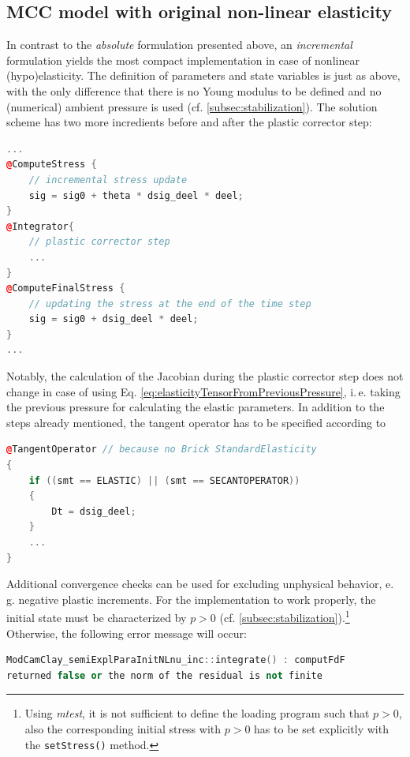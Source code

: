 \documentclass[paper=a4, twoside, pagesize]{scrartcl}
\begin{document}
\subsection{MCC model with original non-linear elasticity}\label{subsec:ImplementationOriginal}

In contrast to the \emph{absolute} formulation presented above, an \emph{incremental} formulation yields the most compact implementation in case of nonlinear (hypo)elasticity. The definition of parameters and state variables is just as above, with the only difference that there is no Young modulus to be defined and no (numerical) ambient pressure is used (cf. \autoref{subsec:stabilization}). The solution scheme has two more incredients before and after the plastic corrector step:

\begin{lstlisting}[language={C++}]
...
@ComputeStress {
    // incremental stress update
    sig = sig0 + theta * dsig_deel * deel;
}
@Integrator{
    // plastic corrector step
    ...
}
@ComputeFinalStress {
    // updating the stress at the end of the time step
    sig = sig0 + dsig_deel * deel;
}
...
\end{lstlisting}
Notably, the calculation of the Jacobian during the plastic corrector step does not change in case of using Eq. \eqref{eq:elasticityTensorFromPreviousPressure}, i.\,e. taking the previous pressure for calculating the elastic parameters.
In addition to the steps already mentioned, the tangent operator has to be specified according to
\begin{lstlisting}[language={C++}]
@TangentOperator // because no Brick StandardElasticity
{
    if ((smt == ELASTIC) || (smt == SECANTOPERATOR))
    {
        Dt = dsig_deel;
    }
    ...
}
\end{lstlisting}
Additional convergence checks can be used for excluding unphysical behavior, e.\,g. negative plastic increments. For the implementation to work properly, the initial state must be characterized by $p>0$ (cf. \autoref{subsec:stabilization}).\footnote{Using \textsl{mtest}, it is not sufficient to define the loading program such that $p>0$, also the corresponding initial stress with $p>0$ has to be set explicitly with the \texttt{setStress()} method.} Otherwise, the following error message will occur:
\begin{lstlisting}[language={C++}]
ModCamClay_semiExplParaInitNLnu_inc::integrate() : computFdF 
returned false or the norm of the residual is not finite
\end{lstlisting}
\end{document}
